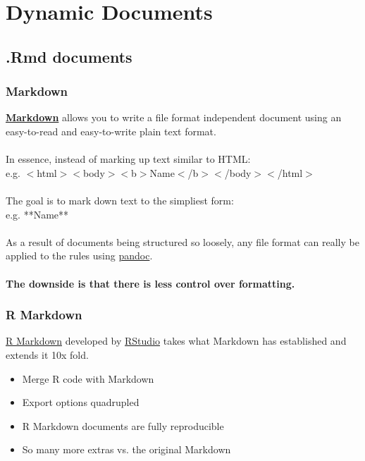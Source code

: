 \documentclass{beamer}\usepackage[]{graphicx}\usepackage[]{color}
\begin{document}
\section{Dynamic Documents}
\subsection{.Rmd documents}

\begin{frame}[fragile]
\frametitle{Markdown}

\href{http://daringfireball.net/projects/markdown/}{\textbf{Markdown}} allows you to write a file format independent document using an easy-to-read and easy-to-write plain text format.
\\$ $\\
In essence, instead of marking up text similar to HTML:
\\
e.g. $<$html$><$body$><$b$>$Name$<$/b$><$/body$><$/html$>$
\\$ $\\
The goal is to mark down text to the simpliest form:
\\
e.g. **Name**
\\$ $\\
As a result of documents being structured so loosely, any file format can really be applied to the rules using \href{http://johnmacfarlane.net/pandoc/}{pandoc}. 
\\$ $\\
\textbf{The downside is that there is less control over formatting.}
\end{frame}

\begin{frame}[fragile]
\frametitle{R Markdown}
\href{http://rmarkdown.rstudio.com/}{R Markdown} developed by \href{http://RStudio.com}{RStudio} takes what Markdown has established and extends it 10x fold.  
\begin{itemize}
\item Merge R code with Markdown
\item Export options quadrupled
\item R Markdown documents are fully reproducible
\item So many more extras vs. the original Markdown
\end{itemize}
\end{frame}
\end{document}
